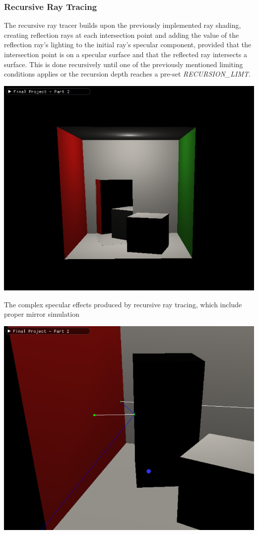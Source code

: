 \documentclass{article}
\begin{document}
    \newpage

    \subsubsection{Recursive Ray Tracing}
    The recursive ray tracer builds upon the previously implemented ray shading,
    creating reflection rays at each intersection point and adding the value of the reflection ray's lighting 
    to the initial ray's specular component, provided that the intersection point is on a specular surface 
    and that the reflected ray intersects a surface. This is done recursively until one of the previously 
    mentioned limiting conditions applies or the recursion depth reaches a pre-set \emph{RECURSION\_LIMT}.

    \begin{center}
        \includegraphics[scale=0.45]{images/recursive_ray_tracer_showcase}

        The complex specular effects produced by recursive ray tracing, which include proper mirror simulation

        \vspace{5mm}

        \includegraphics[scale=0.45]{images/recursive_ray_tracer_debug}


\end{center}
\end{document}
